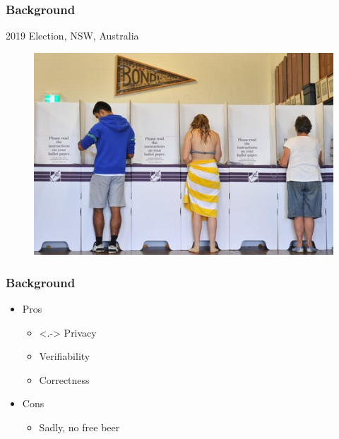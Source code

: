 \documentclass{beamer}
\begin{document}
 
 
   
\begin{frame}
\frametitle{Background}
 {2019 Election, NSW, Australia}
\begin{figure}
	\begin{center}
	\includegraphics[scale=0.50]{image-20160525-25209-cn3ftj.jpg}
	\end{center}
  \end{figure}   
\end{frame}


\begin{frame}
\frametitle{Background}
\begin{itemize}[]
\item Pros 
\begin{itemize}
\item<.-> Privacy 
\item Verifiability
\item Correctness
\end{itemize}
\item Cons
\begin{itemize}
\item Sadly, no free beer
\end{itemize}
\end{itemize}
\end{frame}
\end{document}

